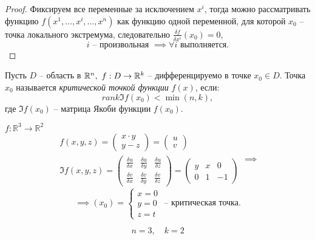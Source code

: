 \begin{proof}
    Фиксируем все переменные за исключением $ x^i $, тогда можно рассматривать функцию $ f(x^1,\ldots,x^i,\ldots,x^n) $ как функцию одной переменной, для которой $ x_0 $ -- точка локального экстремума, следовательно $ \frac{\delta f}{\delta x^i}(x_0) = 0 $,
    \[
        i \text{ -- произвольная }\implies \forall i \text{ выполняется}.
    \]
\end{proof}

\begin{definition}
    Пусть $ D $ -- область в $ \mathbb{R}^n, \ f:D \rightarrow\mathbb{R}^k $ -- дифференцируемо в точке $ x_0 \in D $. Точка $ x_0 $ называется \emph{критической точкой функции} $ f(x) $, если:
    \[
        rank \mathfrak{I} f(x_0) < \min(n,k),
    \] где $ \mathfrak{I}f(x_0) $ -- матрица Якоби функции $ f(x_0) $.
\end{definition}

\begin{example}
    $f:\mathbb{R}^3 \rightarrow\mathbb{R}^2$
    \[
        \begin{array}{l}
            f(x,y,z) = \left(\begin{matrix}
                                     x\cdot y \\ y - z
                                 \end{matrix}\right) = \left(\begin{matrix}
                                                                 u \\ v
                                                             \end{matrix}\right) \\
            \mathfrak{I} f(x,y,z) = \left(\begin{matrix}
                                                  \frac{\delta u}{\delta x} & \frac{\delta u}{\delta y} & \frac{\delta u}{\delta z} \\ \frac{\delta v}{\delta x} & \frac{\delta v}{\delta y} & \frac{\delta v}{\delta z}
                                              \end{matrix}\right) = \left(\begin{matrix}
                                                                              y & x & 0 \\ 0 & 1 & -1
                                                                          \end{matrix} \right)
        \end{array} \implies
    \]
    \[
        \implies (x_0) = \left\{ \begin{array}{l}
            x = 0 \\
            y = 0 \\
            z = t
        \end{array}\right.\text{ -- критическая точка}.
    \]

    \begin{equation*}
        n = 3, \quad k = 2
    \end{equation*}
\end{example}

